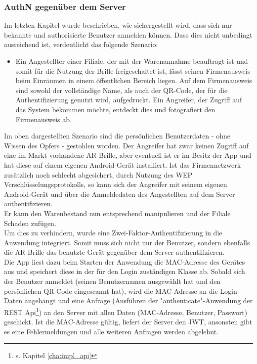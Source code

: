 \subsubsection{\acs{AuthN} gegenüber dem Server}
\label{cha:authn_server}
Im letzten Kapitel wurde beschrieben, wie sichergestellt wird, dass sich nur bekannte und authorisierte Benutzer anmelden können. Dass dies nicht unbedingt ausreichend ist, verdeutlicht das folgende Szenario:
\begin{itemize}
	\item Ein Angestellter einer Filiale, der mit der Warenannahme beauftragt ist und somit für die Nutzung der Brille freigeschaltet ist, lässt seinen Firmenausweis beim Einräumen in einem öffentlichen Bereich liegen. Auf dem Firmenausweis sind sowohl der vollständige Name, als auch der QR-Code, der für die Authentifizierung genutzt wird, aufgedruckt. Ein Angreifer, der Zugriff auf das System bekommen möchte, entdeckt dies und fotografiert den Firmenausweis ab.
\end{itemize}
Im oben dargestellten Szenario sind die persönlichen Benutzerdaten - ohne Wissen des Opfers - gestohlen worden. Der Angreifer hat zwar keinen Zugriff auf eine im Markt vorhandene \ac{AR}-Brille, aber eventuell ist er im Besitz der App und hat diese auf einem eigenen Android-Gerät installiert. Ist das Firmennetzwerk zusätzlich noch schlecht abgesichert, \zB durch Nutzung des \ac{WEP} Verschlüsselungsprotokolls, so kann sich der Angreifer mit seinem eigenen Android-Gerät und über die Anmeldedaten des Angestellten auf dem Server authentifizieren.\\
Er kann den Warenbestand nun entsprechend manipulieren und der Filiale Schaden zufügen.\\

Um dies zu verhindern, wurde eine Zwei-Faktor-Authentifizierung in die Anwendung integriert. Somit muss sich nicht nur der Benutzer, sondern ebenfalls die \ac{AR}-Brille \bzw das benutzte Gerät gegenüber dem Server authentifizieren.\\

Die App liest dazu beim Starten der Anwendung die \ac{MAC}-Adresse des Gerätes aus und speichert diese in der für den Login zuständigen Klasse ab. Sobald sich der Benutzer anmeldet (seinen Benutzernamen ausgewählt hat und den persönlichen QR-Code eingescannt hat), wird die \ac{MAC}-Adresse an die Login-Daten angehängt und eine Anfrage (Ausführen der "authenticate"-Anwendung der REST Api\footnote{s. Kapitel \ref{cha:impl_api}}) an den Server mit allen Daten (\ac{MAC}-Adresse, Benutzer, Passwort) geschickt. Ist die \ac{MAC}-Adresse gültig, liefert der Server den \ac{JWT}, ansonsten gibt es eine Fehlermeldungen und alle weiteren Anfragen werden abgelehnt.\\

